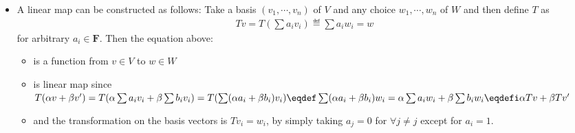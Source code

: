 \begin{description}
\begin{itemize}
  \item A linear map can be constructed as follows: Take a basis $(v_1,\cdots,v_n)$ of $V$ and any choice $w_1,\cdots,w_n$  of $W$ and then define $T$ as
  \begin{align*}
  Tv = T(\sum a_i v_i) \eqdef \sum a_i w_i = w
  \end{align*}
  for arbitrary $a_i\in\mathbf{F}$. Then the equation above:
  \begin{itemize}
    \item is a function from $v\in V$ to $w\in W$
    \item is linear map since $T(\alpha v+ \beta v') = T(\alpha \sum a_i v_i + \beta \sum  b_i v_i) = T(\sum (\alpha a_i +  \beta b_i) v_i) \eqdef \sum (\alpha a_i +  \beta b_i) w_i = \alpha \sum a_i w_i + \beta \sum b_i w_i \eqdefi \alpha Tv + \beta Tv' $  
    \item and the transformation on the basis vectors is $Tv_i=w_i$, by simply taking $a_j=0$ for $\forall j\ne j$ except for $a_i=1$.
  \end{itemize}
  \end{itemize}
  

\end{description}
